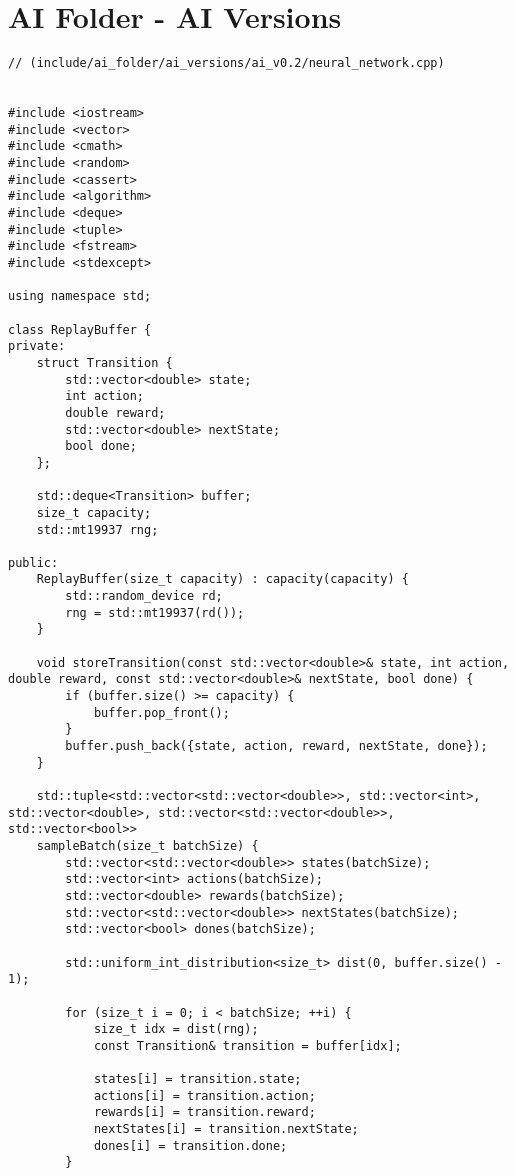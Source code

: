 \label{Appendix A}
\section*{AI Folder - AI Versions}
\begin{verbatim}
// (include/ai_folder/ai_versions/ai_v0.2/neural_network.cpp)
 
 
#include <iostream>
#include <vector>
#include <cmath>
#include <random>
#include <cassert>
#include <algorithm>
#include <deque>
#include <tuple>
#include <fstream>
#include <stdexcept>
 
using namespace std;
 
class ReplayBuffer {
private:
    struct Transition {
        std::vector<double> state;
        int action;
        double reward;
        std::vector<double> nextState;
        bool done;
    };
 
    std::deque<Transition> buffer;
    size_t capacity;
    std::mt19937 rng;
 
public:
    ReplayBuffer(size_t capacity) : capacity(capacity) {
        std::random_device rd;
        rng = std::mt19937(rd());
    }
 
    void storeTransition(const std::vector<double>& state, int action, double reward, const std::vector<double>& nextState, bool done) {
        if (buffer.size() >= capacity) {
            buffer.pop_front();
        }
        buffer.push_back({state, action, reward, nextState, done});
    }
 
    std::tuple<std::vector<std::vector<double>>, std::vector<int>, std::vector<double>, std::vector<std::vector<double>>, std::vector<bool>>
    sampleBatch(size_t batchSize) {
        std::vector<std::vector<double>> states(batchSize);
        std::vector<int> actions(batchSize);
        std::vector<double> rewards(batchSize);
        std::vector<std::vector<double>> nextStates(batchSize);
        std::vector<bool> dones(batchSize);
 
        std::uniform_int_distribution<size_t> dist(0, buffer.size() - 1);
 
        for (size_t i = 0; i < batchSize; ++i) {
            size_t idx = dist(rng);
            const Transition& transition = buffer[idx];
 
            states[i] = transition.state;
            actions[i] = transition.action;
            rewards[i] = transition.reward;
            nextStates[i] = transition.nextState;
            dones[i] = transition.done;
        }
 

\end{verbatim}
